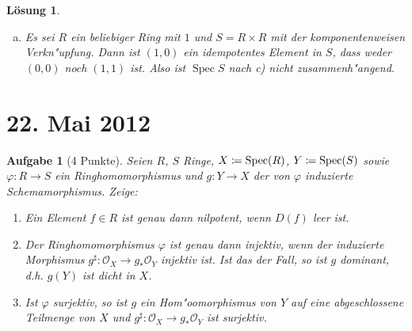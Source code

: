 \documentclass[paper = A4, fontsize=12pt, numbers=noendperiod, chapterprefix=true]{scrbook}
\theoremstyle{break}
\newtheorem{Aufg}{Aufgabe}
\newtheorem{Loes}{L\"osung}
\theoremstyle{nonumberbreak}
\theoremstyle{nonumberplain}
\DeclareMathOperator{\Spec}{Spec}
\begin{document}
\begin{Loes}
\begin{enumerate}[a)]
  Nun sei $\Spec(R)$ nicht zusammenh"angend. Wir finden ein drittes idempotentes Element. Sei $\Spec(R) = V_1 \cup V_2$ eine Zerlegung in abgeschlossene, disjunkte, nichtleere Teilmengen. Es ist $V_1 = V(I_1)$ und $V_2 = V(I_2)$, f"ur Ideale $I_1, I_2 \subseteq R$. Da ihr Durchschnitt $V(I_1) \cap V(I_2) = V(I_1+I_2) = \emptyset = V(1)$ ist, folgt $I_1+I_2 = R$, und es gibt $e_1\in I_1$, $e_2\in I_2$ mit $e_1+e_2 = 1$. Andererseits ist weder $e_1$ noch $e_2$ eine Einheit, denn beide Verschwindungsmengen sind nichtleer. Au\ss erdem ist $V(I_1)\cup V(I_2) = V(I_1\cdot I_2) = \Spec(R) = V(\sqrt{0})$ gleich der Verschwindungsmenge des Nilradikals. Also folgt $I_1\cdot I_2 \subseteq \sqrt{0}$ und damit ist $e_1e_2$ nilpotent.

  \item Es sei $R$ ein beliebiger Ring mit $1$ und $S= R\times R$ mit der komponentenweisen Verkn"upfung. Dann ist $(1,0)$ ein idempotentes Element in $S$, dass weder $(0,0)$ noch $(1,1)$ ist. Also ist $\Spec S$ nach c) nicht zusammenh"angend.
\end{enumerate}\end{Loes}

\newpage
\section{22. Mai 2012}
\setcounter{Aufg}{0}
\setcounter{Loes}{0}

\begin{Aufg}[4 Punkte]
 Seien $R$, $S$ Ringe, $X\coloneqq\textup{Spec}(R)$, $Y\coloneqq\textup{Spec}(S)$ sowie $\varphi \colon R \to S$ ein Ringhomomorphismus und $g \colon Y \to X$ der von $\varphi$ induzierte Schemamorphismus. Zeige:
\begin{enumerate}%
\item Ein Element $f \in R$ ist genau dann nilpotent, wenn $D(f)$ leer ist.
\item Der Ringhomomorphismus $\varphi$ ist genau dann injektiv, wenn der induzierte Morphismus $g^\sharp \colon \mathcal{O}_X \to g_* \mathcal{O}_Y$ injektiv ist. Ist das der Fall, so ist $g$ dominant, d.h. $g(Y)$ ist dicht in $X$.
\item Ist $\varphi$ surjektiv, so ist $g$ ein Hom"oomorphismus von $Y$ auf eine abgeschlossene Teilmenge von $X$ und $g^\sharp \colon \mathcal{O}_X \rightarrow g_* \mathcal{O}_Y$ ist surjektiv.
\end{enumerate}
\end{Aufg}
\end{document}
